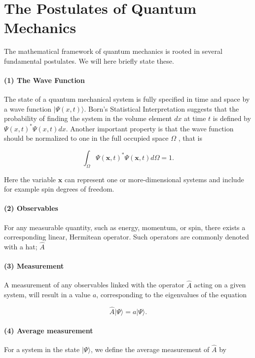 \section{The Postulates of Quantum Mechanics}

The mathematical framework of quantum mechanics is rooted in several
fundamental postulates. We will here briefly state these.

\paragraph{(1) The Wave Function}
The state of a quantum mechanical system is fully specified in time and space by a wave function $\vert \Psi(x,t) \rangle$. Born's Statistical Interpretation \cite{Griffiths2005} suggests that the probability of finding the system in the volume element $dx$ at time $t$ is defined by $\Psi(x,t)^* \Psi(x,t) dx$. Another important property is that the wave function should be normalized to one in the full occupied space $\Omega$ \cite{Griffiths2005}, that is

$$ \int_\Omega \Psi(\mathbf{x},t)^* \Psi(\mathbf{x},t) d\Omega = 1. $$

Here the variable $\mathbf{x}$ can represent one or more-dimensional systems and include for example spin degrees of freedom. 
\paragraph{(2) Observables} For any measurable quantity, such as energy, momentum, or spin, there exists a corresponding linear, Hermitean operator. Such operators are commonly denoted with a hat; $\hat{A}$

\paragraph{(3) Measurement} A measurement of any observables linked with the operator $\hat{A}$ acting on a given system, will result in a value $a$, corresponding to the eigenvalues of the equation

$$ \hat{A} \vert \Psi \rangle = a \vert \Psi \rangle. $$

\paragraph{(4) Average measurement} For a system in the state $\vert \Psi \rangle$, we define the average measurement of $\hat{A}$ by


